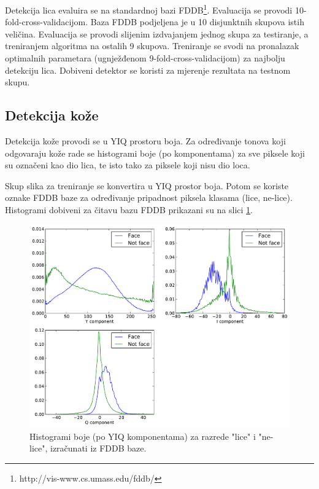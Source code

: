 \documentclass[times, utf8, seminar, numeric]{fer}
\begin{document}
Detekcija lica evaluira se na standardnoj bazi FDDB\footnote{http://vis-www.cs.umass.edu/fddb/}.
Evaluacija se provodi 10-fold-cross-validacijom. Baza FDDB podjeljena je u 10 disjunktnih
skupova istih veličina. Evaluacija se provodi slijenim izdvajanjem jednog skupa za testiranje,
a treniranjem algoritma na ostalih 9 skupova. Treniranje se svodi na pronalazak optimalnih
parametara (ugnježđenom 9-fold-cross-validacijom) za najbolju detekciju lica. Dobiveni detektor
se koristi za mjerenje rezultata na testnom skupu.

\subsection{Detekcija kože}

Detekcija kože provodi se u YIQ prostoru boja. Za određivanje tonova koji odgovaraju kože
rade se histogrami boje (po komponentama) za sve piksele koji su označeni kao dio lica, te
isto tako za piksele koji nisu dio loca.

Skup slika za treniranje se konvertira u YIQ prostor boja. Potom se koriste oznake FDDB baze
za određivanje pripadnost piksela klasama (lice, ne-lice). Histogrami dobiveni za čitavu bazu
FDDB prikazani su na slici \ref{fig:fddb_hist}.

\begin{figure}[!htb]
\centering
\includegraphics[width=\textwidth]{raw/fddb_YIQ_histogram_all_folds.pdf}
\caption{Histogrami boje (po YIQ komponentama) za razrede "lice" i "ne-lice", izračunati iz FDDB baze.}
\label{fig:fddb_hist}
\end{figure}
\end{document}

